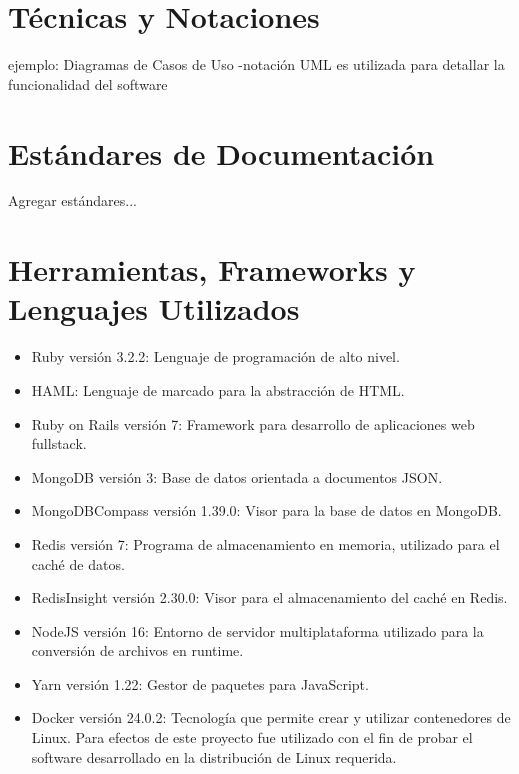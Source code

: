 \section{Técnicas y Notaciones}
ejemplo: Diagramas de Casos de Uso -notación UML es utilizada para detallar la funcionalidad del software

\section{Estándares de Documentación}
Agregar estándares...

\section{Herramientas, Frameworks y  Lenguajes Utilizados}
\begin{itemize}
	\item Ruby versión 3.2.2: Lenguaje de programación de alto nivel.
	\item HAML: Lenguaje de marcado para la abstracción de HTML.
	\item Ruby on Rails versión 7: Framework para desarrollo de aplicaciones web fullstack.
	\item MongoDB versión 3: Base de datos orientada a documentos JSON.
	\item MongoDBCompass versión 1.39.0: Visor para la base de datos en MongoDB.
	\item Redis versión 7: Programa de almacenamiento en memoria, utilizado para el caché de datos.
	\item RedisInsight versión 2.30.0: Visor para el almacenamiento del caché en Redis.
	\item NodeJS versión 16: Entorno de servidor multiplataforma utilizado para la conversión de archivos en runtime.
	\item Yarn versión 1.22: Gestor de paquetes para JavaScript.
	\item Docker versión 24.0.2: Tecnología que permite crear y utilizar contenedores de Linux. Para efectos de este proyecto fue utilizado con el fin de probar el software desarrollado en la distribución de Linux requerida.
\end{itemize}





